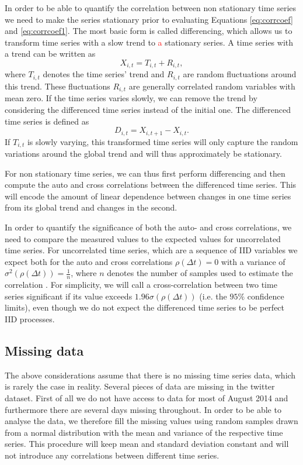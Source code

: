 \documentclass[12pt, a4paper]{article}
\begin{document}
In order to be able to quantify the correlation between non stationary time series we need to make the series stationary prior to evaluating Equations \ref{eq:corrcoef} and \ref{eq:corrcoef1}. The most basic form is called differencing, which allows us to transform time series with a slow trend to \textcolor{red}{a} stationary series. A time series with a trend can be written as \cite{dettling14}
\begin{equation}
X_{i, t} = T_{i, t} + R_{i, t},
\end{equation} 
where $T_{i, t}$ denotes the time series' trend and $R_{i, t}$ are random fluctuations around this trend. These fluctuations $R_{i, t}$ are generally correlated random variables with mean zero. If the time series varies slowly, we can remove the trend by considering the differenced time series instead of the initial one. The differenced time series is defined as \cite{dettling14}
\begin{equation}
D_{i, t} = X_{i, t+1}- X_{i, t}.
\label{eq:diff}
\end{equation} 
If $T_{i, t}$ is slowly varying, this transformed time series will only capture the random variations around the global trend and will thus approximately be stationary.

For non stationary time series, we can thus first perform differencing and then compute the auto and cross correlations between the differenced time series. This will encode the amount of linear dependence between changes in one time series from its global trend and changes in the second. 

In order to quantify the significance of both the auto- and cross correlations, we need to compare the measured values to the expected values for uncorrelated time series. For uncorrelated time series, which are a sequence of IID variables we expect both for the auto and cross correlations $\rho(\Delta t) = 0$ with a variance of $\sigma^{2}(\rho(\Delta t)) = \frac{1}{n}$, where $n$ denotes the number of samples used to estimate the correlation \cite{dettling14}. For simplicity, we will call a cross-correlation between two time series significant if its value exceeds $1.96 \sigma(\rho(\Delta t))$ (i.e. the $95 \%$ confidence limits), even though we do not expect the differenced time series to be perfect IID processes. 

\subsection{Missing data}\label{sec:missingdata}
The above considerations assume that there is no missing time series data, which is rarely the case in reality. Several pieces of data are missing in the twitter dataset. First of all we do not have access to data for most of August 2014 and furthermore there are several days missing throughout. In order to be able to analyse the data, we therefore fill the missing values using random samples drawn from a normal distribution with the mean and variance of the respective time series. This procedure will keep mean and standard deviation constant and will not introduce any correlations between different time series.
\end{document}

